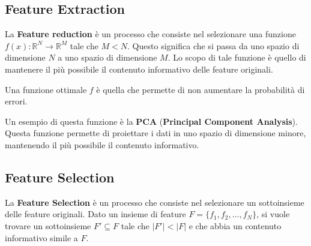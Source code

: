 \subsection{Feature Extraction}
La \textbf{Feature reduction} è un processo che consiste nel selezionare una
funzione $f(x): \mathbb{R}^N \to \mathbb{R}^M$ tale che $M < N$. Questo
significa che si passa da uno spazio di dimensione $N$ a uno spazio di dimensione
$M$. Lo scopo di tale funzione è quello di mantenere il più possibile il
contenuto informativo delle feature originali.

Una funzione ottimale $f$ è quella che permette di non aumentare la probabilità
di errori.

Un esempio di questa funzione è la \textbf{PCA} (\textbf{Principal Component
      Analysis}). Questa funzione permette di proiettare i dati in uno spazio di
dimensione minore, mantenendo il più possibile il contenuto informativo.
\subsection{Feature Selection}
La \textbf{Feature Selection} è un processo che consiste nel selezionare un
sottoinsieme delle feature originali. Dato un insieme di feature $F = \{f_1, f_2,
      \ldots, f_N\}$, si vuole trovare un sottoinsieme $F' \subseteq F$ tale che
$|F'| < |F|$ e che abbia un contenuto informativo simile a $F$.

